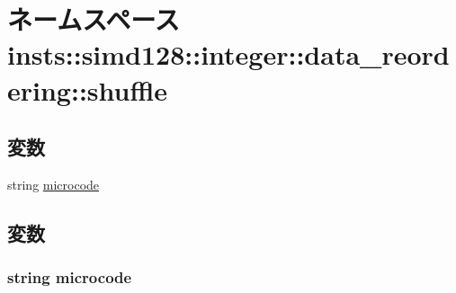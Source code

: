\hypertarget{namespaceinsts_1_1simd128_1_1integer_1_1data__reordering_1_1shuffle}{
\section{ネームスペース insts::simd128::integer::data\_\-reordering::shuffle}
\label{namespaceinsts_1_1simd128_1_1integer_1_1data__reordering_1_1shuffle}
}
\subsection*{変数}
\begin{DoxyCompactItemize}
\item 
string \hyperlink{namespaceinsts_1_1simd128_1_1integer_1_1data__reordering_1_1shuffle_a770f11a173e99389a8802f0107ed8f52}{microcode}
\end{DoxyCompactItemize}


\subsection{変数}
\hypertarget{namespaceinsts_1_1simd128_1_1integer_1_1data__reordering_1_1shuffle_a770f11a173e99389a8802f0107ed8f52}{
\subsubsection[{microcode}]{\setlength{\rightskip}{0pt plus 5cm}string {\bf microcode}}}
\label{namespaceinsts_1_1simd128_1_1integer_1_1data__reordering_1_1shuffle_a770f11a173e99389a8802f0107ed8f52}
